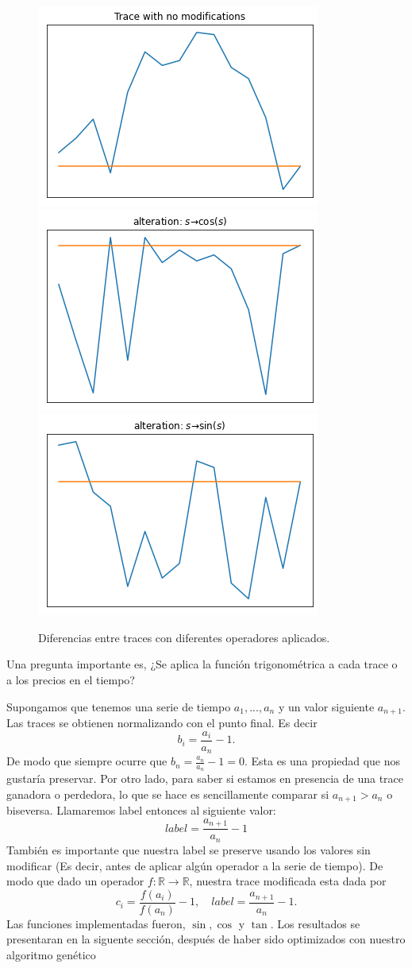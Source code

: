 \documentclass[11pt]{article}
\begin{document}
\begin{figure}[H]

    \centering
    \includegraphics[width=.3\textwidth]{../src/imgs/trace.png}\hfill
    \includegraphics[width=.3\textwidth]{../src/imgs/trace_cos.png}\hfill
    \includegraphics[width=.3\textwidth]{../src/imgs/trace_sin.png}
    
    \caption{Diferencias entre traces con diferentes operadores aplicados.}
    \label{fig:figure3}
    
\end{figure}

Una pregunta importante es, ¿Se aplica la función trigonométrica a cada trace o a los precios en el tiempo?

Supongamos que tenemos una serie de tiempo $a_1, ..., a_n$ y un valor siguiente $a_{n+1}$. Las traces se obtienen normalizando con el punto final. Es decir 
\begin{equation}
    b_i = \frac{a_i}{a_n}-1. 
\end{equation}
De modo que siempre ocurre que $b_n = \frac{a_n}{a_n} -1 = 0$. Esta es una propiedad que nos gustaría preservar. Por otro lado, para saber si estamos en presencia de una trace ganadora o perdedora, lo que se hace es sencillamente comparar si $a_{n+1} > a_n$ o biseversa. Llamaremos label entonces al siguiente valor:
\begin{equation}
    label = \frac{a_{n+1}}{a_n} -1
\end{equation}
También es importante que nuestra label se preserve usando los valores sin modificar (Es decir, antes de aplicar algún operador a la serie de tiempo). De modo que dado un operador $f: \mathbb R \to \mathbb R$, nuestra trace modificada esta dada por
\begin{equation}
    c_i = \frac{f(a_i)}{f(a_n)}-1, \quad label = \frac{a_{n+1}}{a_n} -1.
\end{equation}
Las funciones implementadas fueron, $\sin, \cos$ y $\tan$.  Los resultados se presentaran en la siguente sección, después de haber sido optimizados con nuestro algoritmo genético
\end{document}
